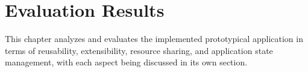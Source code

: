 \chapter{Evaluation Results}
\label{chap:EvaluationResults}
This chapter analyzes and evaluates the implemented prototypical application in terms of reusability, extensibility, resource sharing, and application state management, with each aspect being discussed in its own section.




